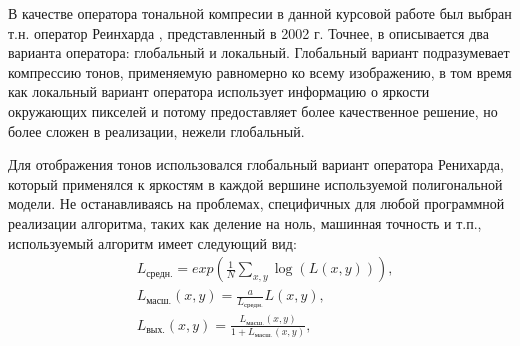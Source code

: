 \documentclass[12pt]{article}
\begin{document}
В качестве оператора тональной компресии в данной курсовой работе был выбран т.н. оператор Реинхарда \cite{Rei02}, представленный в 2002 г. Точнее, в \cite{Rei02} описывается два варианта оператора: глобальный и локальный. Глобальный вариант подразумевает компрессию тонов, применяемую равномерно ко всему изображению, в том время как локальный вариант оператора использует информацию о яркости окружающих пикселей и потому предоставляет более качественное решение, но более сложен в реализации, нежели глобальный.

Для отображения тонов использовался глобальный вариант оператора Ренихарда, который применялся к яркостям в каждой вершине используемой полигональной модели. Не останавливаясь на проблемах, специфичных для любой программной реализации алгоритма, таких как деление на ноль, машинная точность и т.п., используемый алгоритм имеет следующий вид:
\begin{equation}
\begin{split}
&L_{\text{средн.}} = exp \left( \frac{1}{N} \sum_{x, y} \log \left( L(x,y) \right) \right),\\
&L_{\text{масш.}}(x,y) = \frac{a}{L_{\text{средн.}}} L(x,y),\\
&L_{\text{вых.}}(x,y) = \frac{L_{\text{масш.}}(x,y)}{1 + L_{\text{масш.}}(x,y)},
\end{split}\label{eq:rein-1}
\end{equation}
\end{document}
